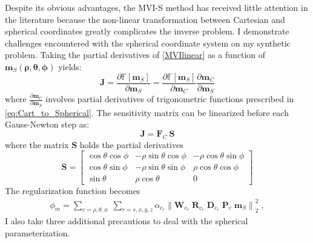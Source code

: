 Despite its obvious advantages, the MVI-S method has received little attention in the literature because the non-linear transformation between Cartesian and spherical coordinates greatly complicates the inverse problem.
I demonstrate challenges encountered with the spherical coordinate system on my synthetic problem.
Taking the partial derivatives of \eqref{MVIlinear} as a function of $\mathbf{m}_S( \boldsymbol{\rho}, \boldsymbol{\theta}, \boldsymbol{\phi})$ yields:
\begin{equation} \label{eq:spherical}
\mathbf{J} = \frac{\partial \mathbb{F}[\mathbf{m}_S]}{\partial \mathbf{m}_S} = \frac{\partial \mathbb{F}[\mathbf{m}_S]}{\partial \mathbf{m}_C} \frac{\partial \mathbf{m}_C}{\partial \mathbf{m}_S}
\end{equation}
where $\frac{\partial \mathbf{m}_C}{\partial \mathbf{m}_S}$ involves partial derivatives of trigonometric functions prescribed in \eqref{eq:Cart_to_Spherical}.
The sensitivity matrix can be linearized before each Gauss-Newton step as:
\begin{equation} \label{eq:lin_sph}
\mathbf{J} = \mathbf{F}_C\: \mathbf{S}
\end{equation}
where the matrix $\mathbf{S}$ holds the partial derivatives
\begin{equation} \label{eq:Smatrix}
\mathbf{S} = \begin{bmatrix} \cos{\theta}\cos{\phi} & -\rho\sin{\theta}\cos{\phi} & -\rho\cos{\theta}\sin{\phi} \\
\cos{\theta}\sin{\phi} & -\rho\sin{\theta}\sin{\phi} & \rho\cos{\theta}\cos{\phi} \\
\sin{\theta} & \rho\cos{\theta} & 0 \end{bmatrix}
\end{equation}
The regularization function becomes
\begin{equation} \label{phi_m_sparse_Spherical}
\begin{split}
\phi_m = \sum_{c = \rho,\theta,\phi} \;
\sum_{r = s,x,y,z} \alpha_{c_r} {\|\mathbf{W}_{c_r} \;\mathbf{R}_{c_r} \; \mathbf{D}_{c_r} \;\mathbf{P}_{c} \; \mathbf{m}_S\|}^2_2 \;,
\end{split}
\end{equation}
I also take three additional precautions to deal with the spherical parameterization.
